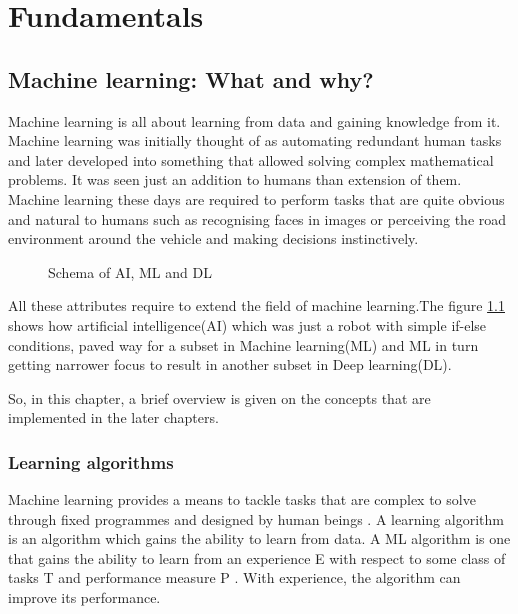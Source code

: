 \chapter{Fundamentals}
\label{chapter:fundamentals}
\section{Machine learning: What and why?}
Machine learning is all about learning from data and gaining knowledge from it. Machine learning was initially thought of as automating
redundant human tasks and later developed into something that allowed solving complex
mathematical problems. It was seen just an addition to humans than extension of them.
Machine learning these days are required to perform tasks that are quite obvious and
natural to humans such as recognising faces in images or perceiving the road environment
around the vehicle and making decisions instinctively.

\begin{figure}
	\centering
    \def\svgwidth{0.5\textwidth}
    \caption{Schema of AI, ML and DL}
    \label{fig:ai_ml_dl}
\end{figure}


All these attributes require to extend the field of machine learning.The figure \ref{fig:ai_ml_dl} shows how artificial
intelligence(AI) which was just a robot with simple if-else conditions, paved way for a
subset in Machine learning(ML) and ML in turn getting narrower focus to result in another
subset in Deep learning(DL).

So, in this chapter, a brief overview is given on the concepts that are implemented in the later chapters.

\subsection{Learning algorithms}
Machine learning provides a means to tackle tasks that are complex to solve through fixed
programmes and designed by human beings \cite{Goodfellow-et-al-2016}. A learning algorithm
is an algorithm which gains the ability to learn from data. A ML algorithm is one that
gains the ability to learn from an experience E with respect to some class of tasks T and
performance measure P \cite{mitchell1996m}. With experience, the algorithm can improve its
performance.


